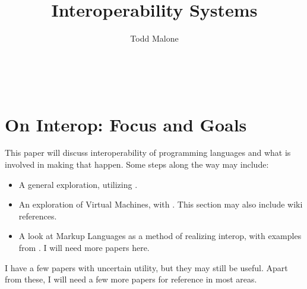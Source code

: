 \documentclass{sig-alternate}
\begin{document}

\title{Interoperability Systems}


\author{
\alignauthor
Todd Malone\\
	\\
	\\
	\\
}

\maketitle


\section{On Interop: Focus and Goals}
This paper will discuss interoperability of programming languages and what is involved in making that happen.
Some steps along the way may include:

\begin{itemize}
\item A general exploration, utilizing \cite{ide:2010, Bromberk:2011, Matthews:2009}.
\item An exploration of Virtual Machines, with \cite{Shetty:2009, Chen:2010, Li:2013}. This section may also include wiki references.
\item A look at Markup Languages as a method of realizing interop, with examples from \cite{Acampora:2013,Bromberk:2011}. I will need more papers here. 
\end{itemize}

I have a few papers with uncertain utility\cite{Kats:2010,Matthews:2009}, but they may still be useful.
Apart from these, I will need a few more papers for reference in most areas.


  

\end{document}
